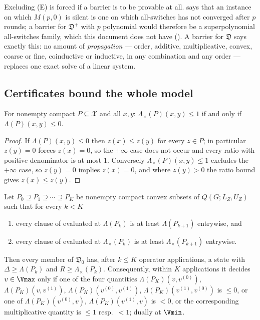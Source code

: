 \begin{remark}\label{ob:scope}
Excluding \textup{(E)} is forced if a barrier is to be provable at all.
 says that an instance on which $M(p,0)$ is
silent is one on which all-switches has not converged after $p$ rounds; a
barrier for $\mathfrak D^{+}$ with $p$ polynomial would therefore be a
superpolynomial all-switches family, which this document does not have
(). A barrier for $\mathfrak D$ says exactly
this: no amount of \emph{propagation} --- order, additive, multiplicative,
convex, coarse or fine, coinductive or inductive, in any combination and
any order --- replaces one exact solve of a linear system.
\end{remark}

\subsection{Certificates bound the whole model}

\begin{lemma}\label{ob:sign}
For nonempty compact $P\subseteq\mathcal X$ and all $x,y$:
$\Lambda_{\times}(P)(x,y)\le1$ if and only if $\Lambda(P)(x,y)\le0$.
\end{lemma}

\begin{proof}
If $\Lambda(P)(x,y)\le0$ then $z(x)\le z(y)$ for every $z\in P$; in
particular $z(y)=0$ forces $z(x)=0$, so the $+\infty$ case does not occur
and every ratio with positive denominator is at most $1$. Conversely
$\Lambda_\times(P)(x,y)\le1$ excludes the $+\infty$ case, so $z(y)=0$
implies $z(x)=0$, and where $z(y)>0$ the ratio bound gives
$z(x)\le z(y)$.
\end{proof}

\begin{theorem}\label{ob:invariance}
Let $P_0\supseteq P_1\supseteq\cdots\supseteq P_K$ be nonempty compact
convex subsets of $Q(G;L_Z,U_Z)$ such that for every $k<K$
\begin{enumerate}[label=\textup{(\roman*)},leftmargin=2.6em]
\item every clause of  evaluated at $\Lambda(P_k)$ is at
  least $\Lambda(P_{k+1})$ entrywise, and
\item every clause of  evaluated at
  $\Lambda_{\times}(P_k)$ is at least $\Lambda_{\times}(P_{k+1})$
  entrywise.
\end{enumerate}
Then every member of $\mathfrak D_0$ has, after $k\le K$ operator
applications, a state with $\Delta\ge\Lambda(P_k)$ and
$R\ge\Lambda_{\times}(P_k)$. Consequently, within $K$ applications it
decides $v\in\Vmax$ only if one of the four quantities
$\Lambda(P_K)(v,v^{(0)})$, $\Lambda(P_K)(v,v^{(1)})$,
$\Lambda(P_K)(v^{(0)},v^{(1)})$, $\Lambda(P_K)(v^{(1)},v^{(0)})$ is
$\le 0$, or one of $\Lambda(P_K)(v^{(0)},v)$, $\Lambda(P_K)(v^{(1)},v)$
is $<0$, or the corresponding multiplicative quantity is $\le1$
resp.\ $<1$; dually at $\Vmin$.
\end{theorem}

